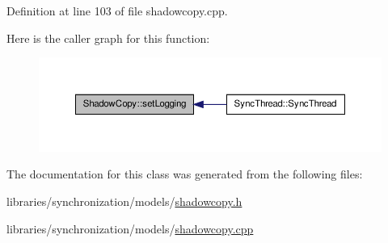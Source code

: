 Definition at line 103 of file shadowcopy.cpp.



Here is the caller graph for this function:\nopagebreak
\begin{figure}[H]
\begin{center}
\leavevmode
\includegraphics[width=372pt]{class_shadow_copy_af50ac8c141db70dc5a4311de5790ccf9_icgraph}
\end{center}
\end{figure}




The documentation for this class was generated from the following files:\begin{DoxyCompactItemize}
\item 
libraries/synchronization/models/\hyperlink{shadowcopy_8h}{shadowcopy.h}\item 
libraries/synchronization/models/\hyperlink{shadowcopy_8cpp}{shadowcopy.cpp}\end{DoxyCompactItemize}
